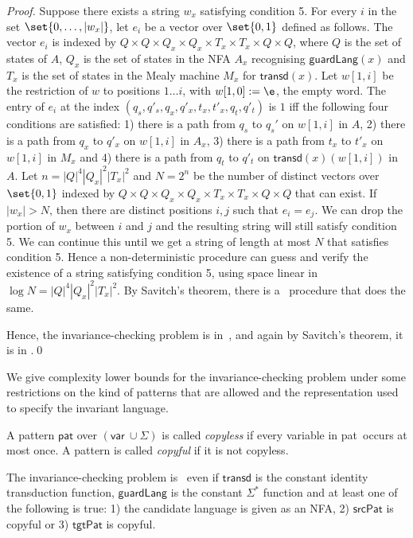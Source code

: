\documentclass[12pt, a4paper]{article}
\newcommand{\var}{\textsf{var}}
\newcommand{\T}{\textsf{transd}}
\newcommand{\spat}{\textsf{srcPat}}
\newcommand{\tpat}{\textsf{tgtPat}}
\newcommand{\VARpat}{\textsf{pat}}
\newcommand{\guardL}{\textsf{guardLang}}
\renewcommand{\aut}{A}
\newcommand{\Aut}{\aut}
\begin{document}
\begin{proof}
	Suppose there exists a string $w_x$ satisfying condition 5. For every $i$ in the set $\set{0,\ldots,|w_x|}$, let $e_i$ be a vector over
	$\set{0,1}$ defined as follows. The vector $e_i$ is indexed by $Q\times Q\times Q_x\times Q_x\times T_x\times T_x \times Q\times Q$,
	where $Q$ is the set of states of $\Aut$, $Q_x$ is the set of states in the NFA $\Aut_x$ recognising $\guardL(x)$ and $T_x$ is the set of
	states in the Mealy machine $M_x$ for $\T(x)$. Let $w[1,i]$ be the restriction of $w$ to positions $1 \ldots i$, with $w[1,0] := \e$, the empty word.
	The entry of $e_i$ at the index $(q_s^{},q'_s, q_x^{},q'_x,t_x^{},t'_x,q_t^{},q'_t)$ is $1$ iff the following four conditions are
	satisfied: 1) there is a path from $q_s$ to $q_s'$ on $w[1,i]$ in $\Aut$, 2) there is a path from $q_x$ to $q'_x$ on $w[1,i]$ in $\Aut_x$,
	3) there is a path from $t_x$ to $t'_x$ on $w[1,i]$ in $M_x$ and 4) there is a path from $q_t$ to $q'_t$ on $\T(x)(w[1,i])$ in $\Aut$.
	Let $n=|Q|^4 |Q_x|^2|T_x|^2$ and $N=2^n$ be the number of distinct vectors over $\set{0,1}$ indexed by
	$Q\times Q\times Q_x\times Q_x\times T_x \times T_x \times Q\times Q$ that can exist. If $|w_x| > N$, then there are distinct positions
	$i,j$ such that $e_i = e_j$. We can drop the portion of $w_x$ between $i$ and $j$ and the resulting string will still satisfy condition 5.
	We can continue this until we get a string of length at most $N$ that satisfies condition 5. Hence a non-deterministic \psp{} procedure can
	guess and verify the existence of a string satisfying condition 5, using space linear in $\log N=|Q|^4 |Q_x|^2|T_x|^2$. By Savitch's
	theorem, there is a \psp\ procedure that does the same.

	Hence, the invariance-checking problem is in \npsp\,, and again by Savitch's theorem, it is in \psp{}.\qed
\end{proof}

We give complexity lower bounds for the invariance-checking problem under some restrictions on the kind of patterns that are allowed and the
representation used to specify the invariant language.
\begin{definition}
	A pattern $\VARpat$ over $(\var ~ \cup \Sigma)$ is called \emph{copyless} if every variable in \VARpat\ occurs at most once. A pattern
	is called \emph{copyful} if it is not copyless.
\end{definition}

\begin{theorem}
	The invariance-checking problem is \psph\ even if $\T$ is the constant identity transduction function, $\guardL$ is the constant
	$\Sigma^*$ function and at least one of the following is true: 1) the candidate language is given as an NFA, 2) $\spat$ is copyful
	or 3) $\tpat$ is copyful.
\end{theorem}
\end{document}
